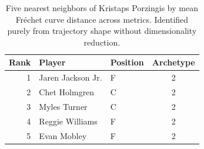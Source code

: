 \begin{table}[htbp]
  \centering\small
  \begin{tabular}{rllc}
    \toprule
    Rank & Player & Position & Archetype \\
    \midrule
    1 & Jaren Jackson Jr. & F & 2 \\
    2 & Chet Holmgren & C & 2 \\
    3 & Myles Turner & C & 2 \\
    4 & Reggie Williams & F & 2 \\
    5 & Evan Mobley & F & 2 \\
    \bottomrule
  \end{tabular}
  \caption{Five nearest neighbors of Kristaps Porzingis by mean Fr\'{e}chet curve distance across metrics. Identified purely from trajectory shape without dimensionality reduction.}
  \label{tab:Kristaps_Porzingis_frechet_curve_neighbors}
\end{table}

